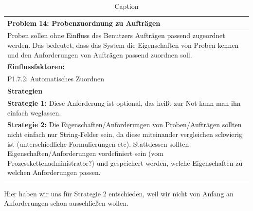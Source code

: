 \documentclass[enabledeprecatedfontcommands,fontsize=12pt,paper=a4,twoside]{scrartcl}
\begin{document}
\begin{table}[H]
    \centering
    \begin{tabular}{|p{15cm}|}
    \hline
          \textbf{Problem 14:} Probenzuordnung zu Aufträgen
          \\ \hline
          Proben sollen ohne Einfluss des Benutzers Aufträgen passend zugeordnet werden. Das bedeutet, dass das System die Eigenschaften von Proben kennen und den Anforderungen von Aufträgen passend zuordnen soll.
          \\ \hline
          \textbf{Einflussfaktoren: } \\
          P1.7.2: Automatisches Zuordnen \\
          \hline
          \textbf{Strategien} \\ \hline
          \textbf{Strategie 1:} Diese Anforderung ist optional, das heißt zur Not kann man ihn einfach weglassen. \\
	  \textbf{Strategie 2:} Die Eigenschaften/Anforderungen von Proben/Aufträgen sollten nicht einfach nur String-Felder sein, da diese miteinander vergleichen schwierig ist (unterschiedliche Formulierungen etc). Stattdessen sollten Eigenschaften/Anforderungen vordefiniert sein (vom Prozesskettenadministrator?) und gespeichert werden, welche Eigenschaften zu welchen Anforderungen passen. \\
          \\ \hline
    \end{tabular}
    \caption{Caption}
    \label{tab:my_label}
\end{table}
Hier haben wir uns für Strategie 2 entschieden, weil wir nicht von Anfang an Anforderungen schon ausschließen wollen. \\
\end{document}
